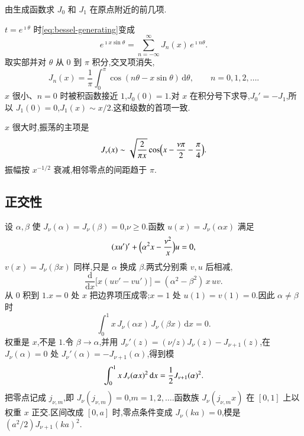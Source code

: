\begin{example}
由生成函数求 $J_0$ 和 $J_1$ 在原点附近的前几项.
\end{example}
\begin{solution}
$t=e^{\imath\theta}$ 时\eqref{eq:bessel-generating}变成
\begin{equation}
  e^{\imath x\sin\theta}=\sum_{n=-\infty}^{\infty} J_n(x)\, e^{\imath n\theta}.
\end{equation}
取实部并对 $\theta$ 从 $0$ 到 $\pi$ 积分,交叉项消失,
\begin{equation}
  J_n(x)=\frac{1}{\pi}\int_0^{\pi}\cos(n\theta-x\sin\theta)\,\mathrm{d}\theta,
  \qquad n=0,1,2,\ldots.
\end{equation}
$x$ 很小、$n=0$ 时被积函数接近 $1$,$J_0(0)=1$.对 $x$ 在积分号下求导,$J_0'=-J_1$,所以 $J_1(0)=0$,$J_1(x)\sim x/2$.这和级数的首项一致.
\end{solution}

$x$ 很大时,振荡的主项是
\begin{equation}
  J_\nu(x)\sim\sqrt{\frac{2}{\pi x}}
  \cos\Bigl(x-\frac{\nu\pi}{2}-\frac{\pi}{4}\Bigr).
\end{equation}
振幅按 $x^{-1/2}$ 衰减,相邻零点的间距趋于 $\pi$.

\subsection{正交性}
设 $\alpha,\beta$ 使 $J_\nu(\alpha)=J_\nu(\beta)=0$,$\nu\geq 0$.函数 $u(x)=J_\nu(\alpha x)$ 满足
\begin{equation}
  (x u')'+\Bigl(\alpha^2 x-\frac{\nu^2}{x}\Bigr)u=0,
\end{equation}
$v(x)=J_\nu(\beta x)$ 同样,只是 $\alpha$ 换成 $\beta$.两式分别乘 $v,u$ 后相减,
\begin{equation}
  \frac{\mathrm{d}}{\mathrm{d}x}\bigl[x(u v'-v u')\bigr]=(\alpha^2-\beta^2)\, x\, u v.
\end{equation}
从 $0$ 积到 $1$.$x=0$ 处 $x$ 把边界项压成零;$x=1$ 处 $u(1)=v(1)=0$.因此 $\alpha\neq\beta$ 时
\begin{equation}
  \int_0^1 x\, J_\nu(\alpha x)\, J_\nu(\beta x)\,\mathrm{d}x=0.
\end{equation}
权重是 $x$,不是 $1$.令 $\beta\to\alpha$,并用 $J_\nu'(z)=(\nu/z)J_\nu(z)-J_{\nu+1}(z)$,在 $J_\nu(\alpha)=0$ 处 $J_\nu'(\alpha)=-J_{\nu+1}(\alpha)$,得到模
\begin{equation}
  \int_0^1 x\, J_\nu(\alpha x)^2\,\mathrm{d}x
  ={\frac{1}{2}} J_{\nu+1}(\alpha)^2.
  \label{eq:bessel-norm}
\end{equation}
把零点记成 $j_{\nu,m}$,即 $J_\nu(j_{\nu,m})=0$,$m=1,2,\ldots$.函数族 $J_\nu(j_{\nu,m} x)$ 在 $[0,1]$ 上以权重 $x$ 正交.区间改成 $[0,a]$ 时,零点条件变成 $J_\nu(k a)=0$,模是 $(a^2/2)J_{\nu+1}(ka)^2$.

